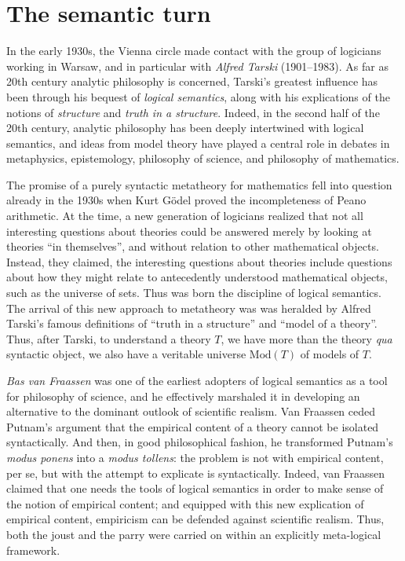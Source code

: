 \section*{The semantic turn}

In the early 1930s, the Vienna circle made contact with the group of
logicians working in Warsaw, and in particular with \emph{Alfred
  Tarski} (1901--1983).  As far as 20th century analytic philosophy is
concerned, Tarski's greatest influence has been through his bequest of
\emph{logical semantics}, along with his explications of the notions
of \emph{structure} and \emph{truth in a structure}.  Indeed, in the
second half of the 20th century, analytic philosophy has been deeply
intertwined with logical semantics, and ideas from model theory have
played a central role in debates in metaphysics, epistemology,
philosophy of science, and philosophy of mathematics.

The promise of a purely syntactic metatheory for mathematics fell into
question already in the 1930s when Kurt G{\"o}del proved the
incompleteness of Peano arithmetic.  At the time, a new generation of
logicians realized that not all interesting questions about theories
could be answered merely by looking at theories ``in themselves'', and
without relation to other mathematical objects.  Instead, they
claimed, the interesting questions about theories include questions
about how they might relate to antecedently understood mathematical
objects, such as the universe of sets.  Thus was born the discipline
of logical semantics.  The arrival of this new approach to metatheory
was was heralded by Alfred Tarski's famous definitions of ``truth in a
structure'' and ``model of a theory''.  Thus, after Tarski, to
understand a theory $T$, we have more than the theory {\it qua}
syntactic object, we also have a veritable universe $\mathrm{Mod}(T)$
of models of $T$.

\emph{Bas van Fraassen} was one of the earliest adopters of logical
semantics as a tool for philosophy of science, and he effectively
marshaled it in developing an alternative to the dominant outlook of
scientific realism.  Van Fraassen ceded Putnam's argument that the
empirical content of a theory cannot be isolated syntactically.  And
then, in good philosophical fashion, he transformed Putnam's {\it
  modus ponens} into a {\it modus tollens}: the problem is not with
empirical content, per se, but with the attempt to explicate is
syntactically.  Indeed, van Fraassen claimed that one needs the tools
of logical semantics in order to make sense of the notion of empirical
content; and equipped with this new explication of empirical content,
empiricism can be defended against scientific realism.  Thus, both the
joust and the parry were carried on within an explicitly meta-logical
framework.

